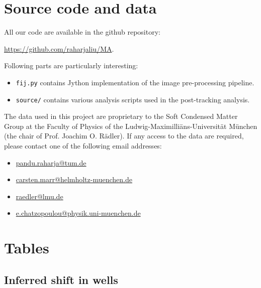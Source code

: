 \documentclass[pdftex,12pt,a4paper]{report}
\begin{document}
\begin{appendices}
\newpage

\chapter{Source code and data}

{
\flushleft

All our code are available in the github repository:

\begin{center}
\href{https://github.com/raharjaliu/MA}{https://github.com/raharjaliu/MA}.
\end{center}

Following parts are particularly interesting:

\begin{itemize}
\item \texttt{fij.py} contains Jython implementation of the image pre-processing pipeline.
\item \texttt{source/} contains various analysis scripts used in the post-tracking analysis.
\end{itemize}
}

The data used in this project are proprietary to the Soft Condensed Matter Group at the Faculty of Physics of the Ludwig-Maximilli\"ans-Universit\"at M\"unchen (the chair of Prof. Joachim O. R\"adler). If any access to the data are required, please contact one of the following email addresses:

\begin{itemize}
\item \href{mailto:pandu.raharja@tum.de}{pandu.raharja@tum.de}
\item \href{mailto:carsten.marr@helmholtz-muenchen.de}{carsten.marr@helmholtz-muenchen.de}
\item \href{raedler@lmu.de}{raedler@lmu.de}
\item \href{e.chatzopoulou@physik.uni-muenchen.de}{e.chatzopoulou@physik.uni-muenchen.de}
\end{itemize}


\chapter{Tables}
\label{chapter:appendix_tables}

\section{Inferred shift in wells}


\end{appendices}
\end{document}
